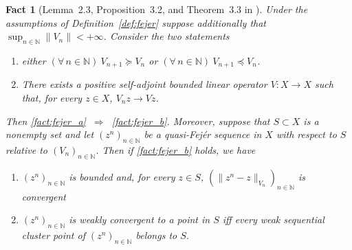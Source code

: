 \documentclass[11pt]{article}
\theoremstyle{plain}
\newtheorem{fact}[theorem]{Fact}
\theoremstyle{definition}
\theoremstyle{remark}
\newcommand{\norm}[1]{\lVert{#1}\rVert}
\newcommand{\HH}{X}
\newcommand{\iter}{n}
\newcommand{\N}{\mathbb{N}}
\begin{document}
\begin{fact}[Lemma~2.3, Proposition~3.2, and Theorem~3.3 in \cite{combettes2013variable}]
\label{fact:fejer}
Under the assumptions of Definition~\ref{def:fejer} suppose additionally that $\sup_{\iter\in \N} \norm{V_n}<+\infty$. Consider the two statements
\begin{enumerate}[label={\rm (\alph*)}]
\vspace{-2ex}
\item\label{fact:fejer_a} either $(\forall\,\iter\in \N)\ V_{\iter+1} \succeq V_{\iter}$ or $(\forall\,\iter\in \N)\ V_{\iter+1} \preceq V_{\iter}$.
\item\label{fact:fejer_b} There exists a positive self-adjoint bounded linear operator $V\colon \HH\to \HH$ such that, for every $z\in \HH$, $V_\iter z \to Vz$.
\end{enumerate}
\vspace{-2ex}
Then \ref{fact:fejer_a} $\ \Rightarrow\ $ \ref{fact:fejer_b}. Moreover, suppose that $S\subset\HH$
is a nonempty set and let $(z^\iter)_{\iter\in \N}$ be a quasi-Fej\'er sequence in $\HH$ with respect to $S$
relative to $(V_\iter)_{\iter\in \N}$. Then if \ref{fact:fejer_b} holds, we have
\vspace{-2ex}
\begin{enumerate}[label={\rm (\roman*)}]
\item $(z^\iter)_{\iter\in \N}$ is bounded and, for every $z\in S$, $(\norm{z^\iter-z}_{V_\iter})_{\iter\in \N}$ is convergent
\item $(z^\iter)_{\iter\in \N}$ is weakly convergent to a point in $S$ iff every weak sequential cluster point of $(z^\iter)_{\iter\in \N}$ belongs to $S$.
\end{enumerate}
\end{fact}
\end{document}
